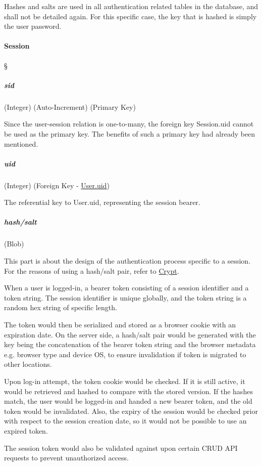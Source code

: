 Hashes and salts are used in all authentication related tables in the database,
and shall not be detailed again. For this specific case, the key that is hashed
is simply the user password.

\paragraph{Session}
\S{} \label{data-layer.design.user.tables.sess}

\subparagraph{sid}
(Integer) (Auto-Increment) (Primary Key)
\label{data-layer.design.user.tables.sess.sid}

Since the user-session relation is one-to-many, the foreign key Session.uid
cannot be used as the primary key. The benefits of such a primary key had already
been mentioned.

\subparagraph{uid}
(Integer) (Foreign Key - \hyperref[data-layer.design.user.tables.user.uid]{User.uid})
\label{data-layer.design.user.tables.sess.uid}

The referential key to User.uid, representing the session bearer.

\subparagraph{hash/salt}
(Blob) \label{data-layer.design.user.tables.sess.crypt}

This part is about the design of the authentication process specific to a
session. For the reasons of using a hash/salt pair, refer to
\hyperref[data-layer.design.user.tables.pswd.crypt]{Crypt}.

When a user is logged-in, a bearer token consisting of a session identifier and a
token string. The session identifier is unique globally, and the token string is
a random hex string of specific length.

The token would then be serialized and stored as a browser cookie with an expiration
date. On the server side, a hash/salt pair would be generated with the key being
the concatenation of the bearer token string and the browser metadata e.g.
browser type and device OS, to ensure invalidation if token is migrated to other
locations.

Upon log-in attempt, the token cookie would be checked. If it is still active,
it would be retrieved and hashed to compare with the stored version. If the hashes
match, the user would be logged-in and handed a new bearer token, and the old token
would be invalidated. Also, the expiry of the session would be checked prior with
respect to the session creation date, so it would not be possible to use an
expired token.

The session token would also be validated against upon certain CRUD API requests
to prevent unauthorized access.

